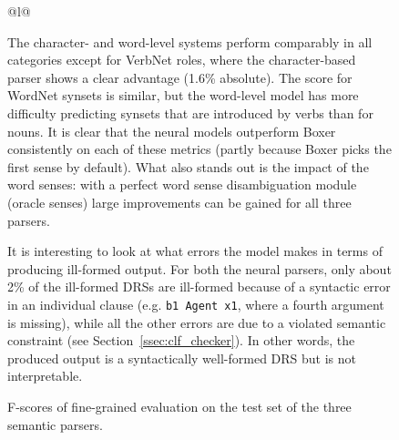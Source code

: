 \documentclass[11pt,a4paper]{article}
\begin{document}
\begin{figure*}[!t]
\begin{subfigure}{50mm}
{{\begin{tabular}[t]{@{}l@{}}
{\begin{table}[!t]
\centering
{}
\caption{F-scores of fine-grained evaluation on the test set of the three semantic parsers.}
\label{tab:auto_eval}
\end{table}

The character- and word-level systems perform comparably in all categories except for VerbNet roles, where the character-based parser shows a clear advantage (1.6\% absolute).
The score for WordNet synsets is similar, but the word-level model has more difficulty predicting synsets that are introduced by verbs than for nouns. It is clear that the neural models outperform Boxer consistently on each of these metrics (partly because Boxer picks the first sense by default). What also stands out is the impact of the word senses: with a perfect word sense disambiguation module (oracle senses) large improvements can be gained for all three parsers.

It is interesting to look at what errors the model makes in terms of producing ill-formed output. For both the neural parsers, only about 2\% of the ill-formed DRSs are ill-formed because of a syntactic error in an individual clause (e.g. \texttt{b1 Agent x1}, where a fourth argument is missing), while all the other errors are due to a violated semantic constraint (see Section~\ref{ssec:clf_checker}). In other words, the produced output is a syntactically well-formed DRS but is not interpretable. 

}
\end{tabular}}}
\end{subfigure}
\end{figure*}
\end{document}
